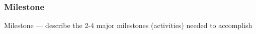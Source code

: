 \subsubsection{Milestone}

Milestone — describe the 2-4 major milestones (activities) needed to accomplish
